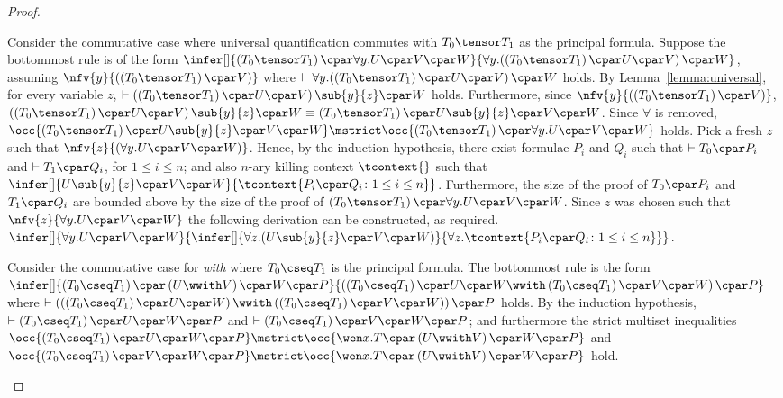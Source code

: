 \documentclass[UKenglish,acmsmall,authorversion]{acmart}
\theoremstyle{plain}
\begin{document}
{\begin{proof}
\begin{enumerate}[label=\textbf{\Alph*},ref=\Alph*,leftmargin=*]
{Consider the commutative case where universal quantification commutes with $T_0 \tensor T_1$  as the principal formula. Suppose the bottommost rule is of the form
$
\infer[]{
\left(T_0 \tensor T_1\right) \cpar \forall y. U \cpar V \cpar W
}{
\mathopen{\forall y.}\left( \left(T_0 \tensor T_1\right) \cpar U \cpar V \right) \cpar W
}$, 
assuming $\nfv{y}{(\left(T_0 \tensor T_1\right) \cpar V)}$
where $\vdash \mathopen{\forall y.}\left( \left(T_0 \tensor T_1\right) \cpar U \cpar V \right) \cpar W$ holds.
By Lemma~\ref{lemma:universal}, for every variable $z$, $\vdash \left( \left(T_0 \tensor T_1\right) \cpar U \cpar V \right)\sub{y}{z} \cpar W$ holds.
Furthermore, since $\nfv{y}{(\left(T_0 \tensor T_1\right) \cpar V)}$, $\left( \left(T_0 \tensor T_1\right) \cpar U \cpar V \right)\sub{y}{z} \cpar W \equiv \left(T_0 \tensor T_1\right) \cpar U\sub{y}{z} \cpar V \cpar W$.
Since $\forall$ is removed, $
\occ{ \left(T_0 \tensor T_1\right) \cpar U\sub{y}{z} \cpar V \cpar W } \mstrict \occ{ \left(T_0 \tensor T_1\right) \cpar \forall y. U \cpar V \cpar W }
$ holds.
Pick a fresh $z$ such that $\nfv{z}{(\forall y. U \cpar V \cpar W)}$.
Hence, by the induction hypothesis, there exist formulae $P_i$ and $Q_i$ such that $\vdash T_0 \cpar P_i$ and $\vdash T_1 \cpar Q_i$, for $1 \leq i \leq n$; and also $n$-ary killing context $\tcontext{}$ such that
$
\infer[]{
U\sub{y}{z} \cpar V \cpar W
}{
\tcontext{ P_i \cpar Q_i \colon 1 \leq i \leq n }
}
$.
Furthermore, the size of the proof of $T_0 \cpar P_i$ and $T_1 \cpar Q_i$ are bounded above by the size of the proof of $\left(T_0 \tensor T_1\right) \cpar \forall y. U \cpar V \cpar W$.
Since $z$ was chosen such that $\nfv{z}{ \forall y. U \cpar V \cpar W }$ the following derivation can be constructed, as required.
$
\infer[]{
\forall y. U \cpar V \cpar W
}{
\infer[]{
\mathopen{\forall z.} \left( U\sub{y}{z} \cpar V \cpar W \right) 
}{
\mathopen{\forall z.} \tcontext{ P_i \cpar Q_i \colon 1 \leq i \leq n }
}}
$.
\smallskip


Consider the commutative case for \textit{with} where $T_0 \cseq T_1$ is the principal formula. The bottommost rule is the form
$
\infer[]{
\left(T_0 \cseq T_1\right) \cpar \left( U \wwith V \right) \cpar W \cpar P
}{
\left(\left(T_0 \cseq T_1\right) \cpar U \cpar W \wwith
\left(T_0 \cseq T_1\right) \cpar V \cpar W\right)
\cpar P
}
$
where $\vdash \left(\left(\left(T_0 \cseq T_1\right) \cpar U \cpar W\right) \wwith \left(\left(T_0 \cseq T_1\right) \cpar V \cpar W\right)\right) \cpar P$ holds.
By the induction hypothesis, $\vdash \left(T_0 \cseq T_1\right) \cpar U \cpar W \cpar P$ and $\vdash \left(T_0 \cseq T_1\right) \cpar V \cpar W \cpar P$; and furthermore the strict multiset inequalities
$\occ{\left(T_0 \cseq T_1\right) \cpar U \cpar W \cpar P} \mstrict \occ{ \wen x. T \cpar \left( U \wwith V \right) \cpar W \cpar P }$
and
$\occ{\left(T_0 \cseq T_1\right) \cpar V \cpar W \cpar P} \mstrict \occ{ \wen x. T \cpar \left( U \wwith V \right) \cpar W \cpar P }$ hold.

}
\end{enumerate}
\end{proof}}
\end{document}
